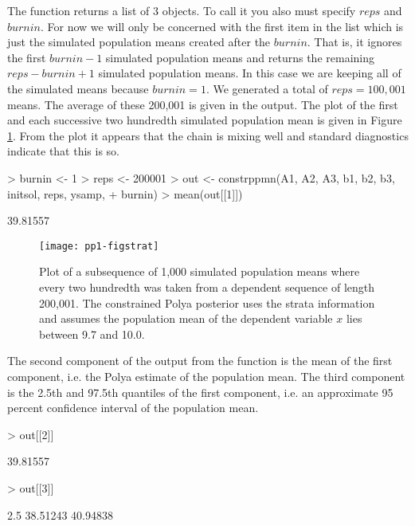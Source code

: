 \documentclass{article}
\begin{document}
The function \verb@constrppmn@ returns a
 list of 3 objects. To call it  you also must 
specify $reps$ and $burnin$. For now we will only be concerned 
with  the first item in the list which is just the simulated population
means created after the $burnin$. That is, it ignores the first
$burnin -1$ simulated population means and returns the 
remaining $reps-burnin +1$
simulated population means. In this case we are keeping all of the 
simulated means because $burnin =1$. 
We generated a total of  $reps=100,001$ means. The average of these 200,001
is given in the output.
The plot of the first and each successive two hundredth simulated 
population mean is given 
in Figure \ref{fig:strat}. From the plot it appears that the chain is 
mixing well and standard diagnostics indicate that this is so.


\begin{Schunk}
\begin{Sinput}
> burnin <- 1
> reps <- 200001
> out <- constrppmn(A1, A2, A3, b1, b2, b3, initsol, reps, ysamp, 
+     burnin)
> mean(out[[1]])
\end{Sinput}
\begin{Soutput}
[1] 39.81557
\end{Soutput}
\end{Schunk}



\begin{figure}
\begin{center}
\texttt{[image: pp1-figstrat]}
\end{center}
\caption{Plot of a subsequence of 1,000 simulated  population 
means where every two hundredth was taken from a dependent sequence 
of length 200,001.  The constrained Polya posterior uses 
the strata information and assumes the population mean of the 
dependent variable $x$ lies between 9.7 and 10.0.}
\label{fig:strat}
\end{figure}

The second component of the output from the function \verb@constrppmn@ 
  is the mean  of the first component, i.e. the Polya estimate of the
  population mean. The third component is the 2.5th and 97.5th
  quantiles of the first component, i.e. an approximate 95 percent
  confidence interval of the population mean.

\begin{Schunk}
\begin{Sinput}
> out[[2]]
\end{Sinput}
\begin{Soutput}
[1] 39.81557
\end{Soutput}
\begin{Sinput}
> out[[3]]
\end{Sinput}
\begin{Soutput}
    2.5%    97.5% 
38.51243 40.94838 
\end{Soutput}
\end{Schunk}
\end{document}
